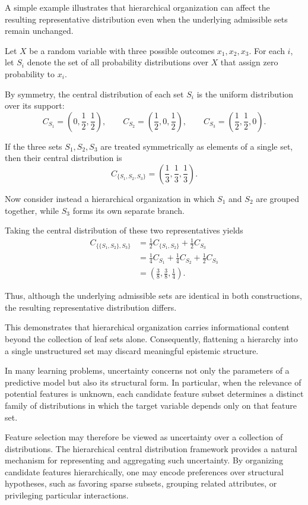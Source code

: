 A simple example illustrates that hierarchical organization can affect the resulting representative distribution
even when the underlying admissible sets remain unchanged.

Let \(X\) be a random variable with three possible outcomes \(x_1,x_2,x_3\).
For each \(i\), let \(S_i\) denote the set of all probability distributions over \(X\) that assign zero probability to \(x_i\).

By symmetry, the central distribution of each set \(S_i\) is the uniform distribution over its support:
\[
    C_{S_1}=\left(0,\frac12,\frac12\right),\qquad
    C_{S_2}=\left(\frac12,0,\frac12\right),\qquad
    C_{S_3}=\left(\frac12,\frac12,0\right).
\]

If the three sets \(S_1,S_2,S_3\) are treated symmetrically as elements of a single set, then their central
distribution is
\[
    C_{\{S_1,S_2,S_3\}}=
    \left(\frac13,\frac13,\frac13\right).
\]

Now consider instead a hierarchical organization in which \(S_1\) and \(S_2\) are grouped together, while \(S_3\)
forms its own separate branch.

Taking the central distribution of these two representatives yields
\begin{align*}
    C_{\{\{S_1,S_2\}, S_3\}}
    &= \frac12 C_{\{S_1,S_2\}} + \frac12 C_{S_3} \\
    &= \frac14 C_{S_1} + \frac14 C_{S_2} + \frac12 C_{S_3} \\
    &= \left(\frac38,\frac38,\frac14\right).
\end{align*}

Thus, although the underlying admissible sets are identical in both constructions, the resulting representative
distribution differs.

This demonstrates that hierarchical organization carries informational content beyond the collection of leaf sets
alone.
Consequently, flattening a hierarchy into a single unstructured set may discard meaningful epistemic structure.

In many learning problems, uncertainty concerns not only the parameters of a predictive model but also its
structural form.
In particular, when the relevance of potential features is unknown, each candidate feature subset determines a distinct
family of distributions in which the target variable depends only on that feature set.

Feature selection may therefore be viewed as uncertainty over a collection of distributions.
The hierarchical central distribution framework provides a natural mechanism for representing and aggregating such
uncertainty.
By organizing candidate features hierarchically, one may encode preferences over structural hypotheses, such as
favoring sparse subsets, grouping related attributes, or privileging particular interactions.

